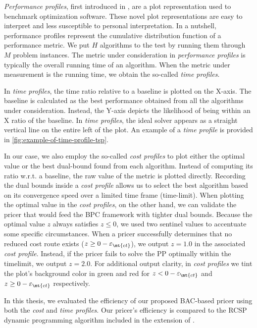 \textit{Performance profiles}, first introduced in \textcite{dolan2002},
are a plot representation used to benchmark optimization software.
These novel plot representations are easy to interpret and less susceptible to personal interpretation.
In a nutshell, performance profiles represent the cumulative distribution function of a performance metric.
We put $H$ algorithms to the test by running them through $M$ problem instances.
The metric under consideration in \textit{performance profiles}
is typically the overall running time of an algorithm.
When the metric under measurement is the running time, we obtain the so-called \textit{time profiles}.

In \textit{time profiles}, the time ratio relative to a baseline is plotted on the X-axis.
The baseline is calculated as the best performance obtained from all the algorithms under consideration.
Instead, the Y-axis depicts the likelihood of being within an X ratio of the baseline.
In \textit{time profiles}, the ideal solver appears as a straight vertical line on the entire left of the plot.
An example of a \textit{time profile} is provided in \cref{fig:example-of-time-profile-tsp}.

In our case, we also employ the so-called \textit{cost profiles} to plot either the optimal value
or the best dual-bound found from each algorithm.
Instead of computing its ratio w.r.t. a baseline, the raw value of the metric is plotted directly.
Recording the dual bounds inside a \textit{cost profile}
allows us to select the best algorithm
based on its convergence speed over a limited time frame (time-limit).
When plotting the optimal value in the \textit{cost profiles}, on the other hand,
we can validate the pricer that would feed the BPC framework with tighter dual bounds.
Because the optimal value $z$ always satisfies $z \le 0$,
we used two sentinel values to accentuate some specific circumstances.
When a pricer successfully determines that no reduced cost route exists
($z \ge 0 - \varepsilon_{\mt{ct}}$),
we output $z = 1.0$ in the associated \textit{cost profile}.
Instead, if the pricer fails to solve the PP optimally within the timelimit,
we output $z = 2.0$.
For additional output clarity, in \textit{cost profiles} we tint
the plot's background color in green and red for $z < 0 - \varepsilon_{\mt{ct}}$ and $z \ge 0 - \varepsilon_{\mt{ct}}$ respectively.

\medskip

In this thesis, we evaluated the efficiency of our proposed BAC-based pricer
using both the \textit{cost} and \textit{time profiles}.
Our pricer's efficiency is compared to the RCSP dynamic programming algorithm
included in the \vrpsolver{} extension \parencite{pessoa2020generic} of \bapcod{}.

